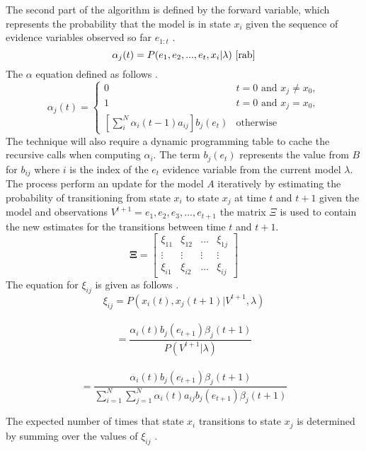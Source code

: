 \documentclass[11pt]{article}
\begin{document}
 
The second part of the algorithm is defined by the forward variable, which represents the probability that the model is in state $x_i$ given the sequence of evidence variables observed so far $e_{1:t}$ \cite{pc}.
$$
\alpha_j(t) = P(e_1,e_2,...,e_t, x_i | \lambda) \text{ \cite{rab}}
$$
The $\alpha$ equation defined as follows \cite{pc}.
\begin{equation*}
\alpha_j(t) = \left\{
    \begin{array}{rl}
    0 & t = 0 \text{ and } x_j \neq x_0,\\
    1 & t = 0 \text{ and } x_j = x_0, \\
    \left[ \sum_i^N \alpha_i(t-1)a_{ij}\right]b_j(e_t) & \text{otherwise} 
    \end{array}
\right.
\end{equation*}
The technique will also require a dynamic programming table to cache the recursive calls when computing $\alpha_i$. The term $b_j(e_t)$ represents the value from $B$ for $b_{ij}$ where $i$ is the index of the $e_t$ evidence variable from the current model $\lambda$.\\
The process perform an update for the model $A$ iteratively by estimating the probability of transitioning from state $x_i$ to state $x_j$ at time $t$ and $t+1$ given the model and observations $V^{t+1} = e_1,e_2, e_3,...,e_{t+1}$ \cite{rab} the matrix $\Xi$ is used to contain the new estimates for the transitions between time $t$ and $t+1$.
\begin{equation*}
 \mathbf{\Xi} = \left[
    \begin{array}{cccc}
    \xi_{11} & \xi_{12} & \ldots & \xi_{1j} \\
    \vdots & \vdots & \vdots & \vdots \\
    \xi_{i1} & \xi_{i2} & \ldots & \xi_{ij}
    \end{array}
    \right]
\end{equation*}
The equation for $\xi_{ij}$ is given as follows \cite{rab}.
$$
\xi_{ij} = P(x_i(t), x_j(t+1) | V^{t+1}, \lambda) 
$$\\
$$
= \frac{\alpha_i(t)b_j(e_{t+1})\beta_j(t+1)}{P(V^{t+1}|\lambda)} 
$$\\
$$
= \frac{\alpha_i(t)b_j(e_{t+1})\beta_j(t+1)}{\sum_{i=1}^N \sum_{j=1}^N \alpha_i(t) a_{ij}b_j(e_{t+1})\beta_j(t+1)}
$$

The expected number of times that state $x_i$ transitions to state $x_j$ is determined by summing over the values of $\xi_{ij}$ \cite{pc} \cite{rab}.\\
\end{document}
